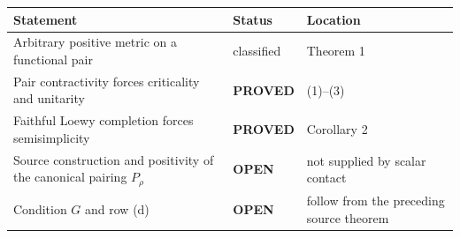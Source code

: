 \documentclass[11pt]{article}
\newcommand{\PROVED}{\textcolor{green!40!black}{\textbf{PROVED}}}
\newcommand{\OPEN}{\textcolor{red!70!black}{\textbf{OPEN}}}
\begin{document}
\begin{center}
\begin{tabular}{>{\raggedright\arraybackslash}p{.58\linewidth}
                >{\centering\arraybackslash}p{.15\linewidth}
                >{\raggedright\arraybackslash}p{.17\linewidth}}
\toprule
Statement & Status & Location \\
\midrule
Arbitrary positive metric on a functional pair & classified & Theorem 1 \\
Pair contractivity forces criticality and unitarity & \PROVED & (1)--(3) \\
Faithful Loewy completion forces semisimplicity & \PROVED & Corollary 2 \\
Source construction and positivity of the canonical pairing $P_\rho$ & \OPEN & not supplied by scalar contact \\
Condition $G$ and row (d) & \OPEN & follow from the preceding source theorem \\
\bottomrule
\end{tabular}
\end{center}
\end{document}
